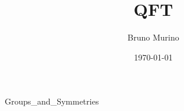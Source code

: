\documentclass{___mymonograph}
\title{QFT} %
\author{Bruno Murino} %
\date{\today} %
\begin{document}
\frontmatter

\monographtp
\dominitoc
\doparttoc
\pagestyle{onlypagenum}
\tableofcontents
\mainmatter

{Groups_and_Symmetries} %



\backmatter
\printbib
\end{document}
